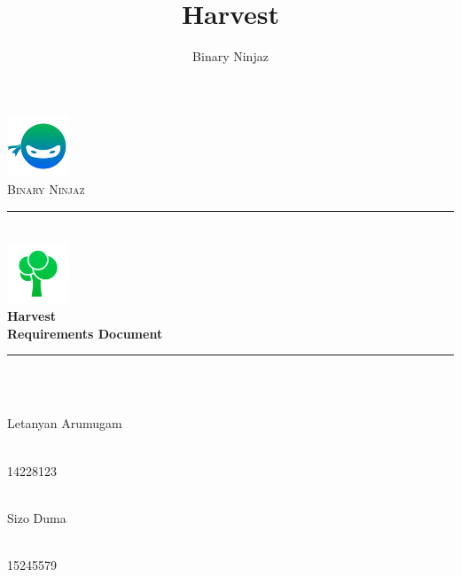 \documentclass[11pt]{article}
\author{Binary Ninjaz}
\title{Harvest}
\begin{document}
\begin{titlepage}

	\begin{center}
		\includegraphics[height=5em]{images/Bin.png}\\
		\textsc{\LARGE Binary Ninjaz}\\[0.3cm]
		\rule{\linewidth}{0.5mm} \\[0.5cm]
		\includegraphics[height=5em]{images/Icon.png}\\
		{ \huge \bfseries Harvest \\
		  \vspace{0.3cm}\large \bfseries Requirements Document}\\[0.5cm]
		\rule{\linewidth}{0.5mm} \\[1cm]


		\begin{minipage}{0.4\textwidth}
			\begin{flushleft} \large
				\emph{} \\
				Letanyan {Arumugam}
			\end{flushleft}
		\end{minipage}
		\begin{minipage}{0.4\textwidth}
			\begin{flushright} \large
				\emph{} \\
				14228123
			\end{flushright}
		\end{minipage}

		\begin{minipage}{0.4\textwidth}
			\begin{flushleft} \large
            	\emph{} \\
				Sizo {Duma}
			\end{flushleft}
		\end{minipage}
		\begin{minipage}{0.4\textwidth}
			\begin{flushright} \large
				\emph{} \\
				15245579
			\end{flushright}
		\end{minipage}


\end{center}
\end{titlepage}
\end{document}
